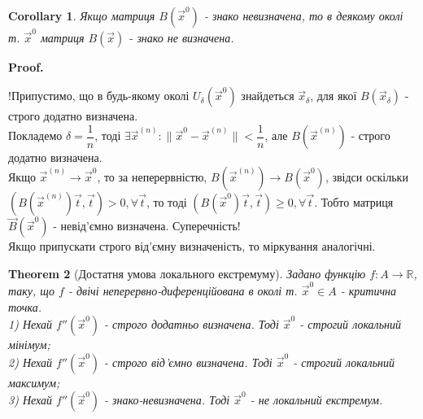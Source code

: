 \documentclass[a4paper, 10pt]{article}
\makeatletter
\def\qed{$\blacksquare$}
\theoremstyle{theoremdd}
\newtheorem{theorem}{Theorem}[subsection]
\theoremstyle{theoremdd}
\theoremstyle{theoremdd}
\theoremstyle{theoremdd}
\theoremstyle{theoremdd}
\theoremstyle{theoremdd}
\theoremstyle{theoremdd}
\theoremstyle{theoremdd}
\theoremstyle{theoremdd}
\newtheorem{corollary}[theorem]{Corollary}
\renewenvironment{proof}[1][Proof.\\]{\par
\pushQED{\hfill \qed}%
\normalfont \topsep6\p@\@plus6\p@\relax
\trivlist
\item\relax
{\bfseries
#1\@addpunct{.}}\hspace\labelsep\ignorespaces
}{%
\popQED\endtrivlist\@endpefalse
}
\newcommand\Norm[1]{\lVert#1\rVert}
\makeatother
\begin{document}
\begin{corollary}
Якщо матриця $B(\vec{x}^0)$ - знако невизначена, то в деякому околі т. $\vec{x}^0$ матриця $B(\vec{x})$ - знако не визначена.
\end{corollary}

\begin{proof}
!Припустимо, що в будь-якому околі $U_\delta (\vec{x}^0)$ знайдеться $\vec{x}_\delta$, для якої $B(\vec{x}_\delta)$ - строго додатно визначена.\\
Покладемо $\delta = \dfrac{1}{n}$, тоді $\exists \vec{x}^{(n)}: \Norm{\vec{x}^0 - \vec{x}^{(n)}} < \dfrac{1}{n}$, але $B(\vec{x}^{(n)})$ - строго додатно визначена.\\
Якщо $\vec{x}^{(n)} \to \vec{x}^{0}$, то за неперервністю, $B(\vec{x}^{(n)}) \to B(\vec{x}^0)$, звідси оскільки $(B(\vec{x}^{(n)}) \vec{t}, \vec{t}) > 0, \forall \vec{t}$, то тоді $(B(\vec{x}^{0}) \vec{t}, \vec{t}) \geq 0, \forall \vec{t}$. Тобто матриця $\vec{B}(\vec{x}^0)$ - невід'ємно визначена. Суперечність!\\
Якщо припускати строго від'ємну визначеність, то міркування аналогічні.
\end{proof}


\begin{theorem}[Достатня умова локального екстремуму]
Задано функцію $f: A \to \mathbb{R}$, таку, що $f$ - двічі неперервно-диференційована в околі т. $\vec{x}^0 \in A$ - критична точка.\\
1) Нехай $f''(\vec{x}^0)$ - строго додатньо визначена. Тоді $\vec{x}^0$ - строгий локальний мінімум;\\
2) Нехай $f''(\vec{x}^0)$ - строго від'ємно визначена. Тоді $\vec{x}^0$ - строгий локальний максимум;\\
3) Нехай $f''(\vec{x}^0)$ - знако-невизначена. Тоді $\vec{x}^0$ - не локальний екстремум.
\end{theorem}
\end{document}
